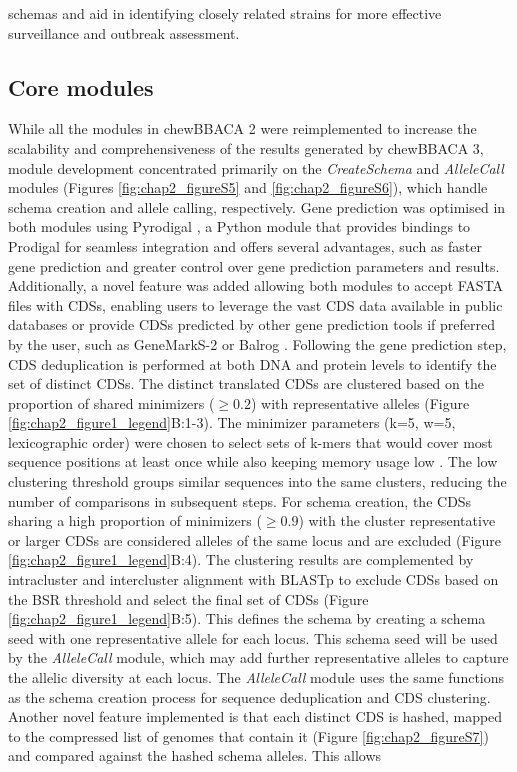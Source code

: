 schemas and aid in identifying closely related strains for more effective surveillance and outbreak assessment.

\subsection{Core modules} \label{ssec:ch2_implementation_core_modules}

While all the modules in chewBBACA 2 were reimplemented to increase the scalability and comprehensiveness of the results generated by chewBBACA 3, module development concentrated primarily on the \textit{CreateSchema} and \textit{AlleleCall} modules (Figures \ref{fig:chap2_figureS5} and \ref{fig:chap2_figureS6}), which handle schema creation and allele calling, respectively. Gene prediction was optimised in both modules using Pyrodigal \citep{larralde_pyrodigal_2022, hyatt_prodigal_2010}, a Python module that provides bindings to Prodigal for seamless integration and offers several advantages, such as faster gene prediction and greater control over gene prediction parameters and results. Additionally, a novel feature was added allowing both modules to accept FASTA files with \acp{CDS}, enabling users to leverage the vast \ac{CDS} data available in public databases or provide \acp{CDS} predicted by other gene prediction tools if preferred by the user, such as GeneMarkS-2 or Balrog \citep{lomsadze_modeling_2018, sommer_balrog_2021}. Following the gene prediction step, \ac{CDS} deduplication is performed at both \ac{DNA} and protein levels to identify the set of distinct \acp{CDS}. The distinct translated \acp{CDS} are clustered based on the proportion of shared minimizers ($\geq0.2$) with representative alleles \citep{schleimer_winnowing_nodate, roberts_reducing_2004, marcais_improving_2017} (Figure \ref{fig:chap2_figure1_legend}B:1-3). The minimizer parameters (k=5, w=5, lexicographic order) were chosen to select sets of k-mers that would cover most sequence positions at least once while also keeping memory usage low \citep{zheng_improved_2020}. The low clustering threshold groups similar sequences into the same clusters, reducing the number of comparisons in subsequent steps. For schema creation, the \acp{CDS} sharing a high proportion of minimizers ($\geq0.9$) with the cluster representative or larger \acp{CDS} are considered alleles of the same locus and are excluded (Figure \ref{fig:chap2_figure1_legend}B:4). The clustering results are complemented by intracluster and intercluster alignment with \ac{BLASTp} to exclude \acp{CDS} based on the \ac{BSR} threshold and select the final set of \acp{CDS} (Figure \ref{fig:chap2_figure1_legend}B:5). This defines the schema by creating a schema seed with one representative allele for each locus. This schema seed will be used by the \textit{AlleleCall} module, which may add further representative alleles to capture the allelic diversity at each locus. The \textit{AlleleCall} module uses the same functions as the schema creation process for sequence deduplication and \ac{CDS} clustering. Another novel feature implemented is that each distinct \ac{CDS} is hashed, mapped to the compressed list of genomes that contain it (Figure \ref{fig:chap2_figureS7}) and compared against the hashed schema alleles. This allows 